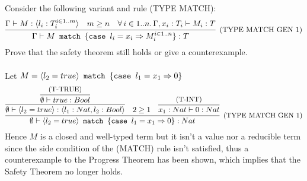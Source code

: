 \subsection{}

Consider the following variant and rule (TYPE MATCH):
\[
	\infer[\text{\small{(TYPE MATCH GEN 1)}}]
	{ \Gamma \vdash \MATCH{M}{\CASE{l_i}{x_i}{M_i^{i \in 1..n}}}: T }
	{
	\Gamma \vdash M: \TVAR{l_i: T_i^{i \in 1..m}} &
	m \ge n &
	\forall\, i \in 1..n.\,\Gamma, x_i: T_i \vdash M_i: T
	}
\]
Prove that the safety theorem still holds or give a counterexample.\\~\\
Let $M = \langle l_2 = true \rangle\texttt{ match }\{\texttt{case }l_1 = x_1 \Rightarrow 0\}$
\[
	\infer[\text{\small{(TYPE MATCH GEN 1)}}]
	{\emptyset \vdash \MATCH{\VAR{l_2 = true}}{\CASE{l_1}{x_1}{0}}: Nat}
	{
		\infer
		{ \emptyset \vdash \VAR{l_2 = true}: \TVAR{l_1: Nat, l_2: Bool} }
		{ \infer{ \emptyset \vdash true: Bool }{\text{\small{(T-TRUE)}}} } &
		2 \ge 1 &
		\infer{ x_1: Nat \vdash 0: Nat }
		{\text{\small{(T-INT)}}}
	}
\]
Hence $M$ is a closed and well-typed term but it isn't a value nor a reducible term since the side
condition of the (MATCH) rule isn't satisfied, thus a counterexample to the Progress Theorem has
been shown, which implies that the Safety Theorem no longer holds.

